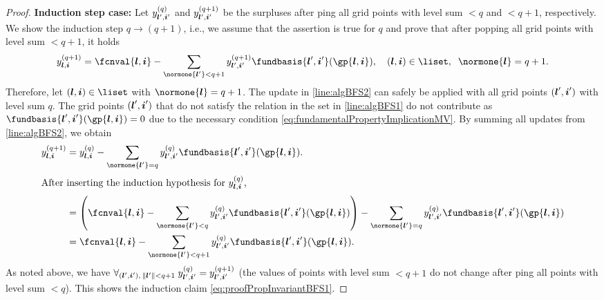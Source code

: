 \begin{proof}
  \noindent
  \textbf{Induction step case:}
  Let $\linout[(q)]{\*l',\*i'}$ and
  $\linout[(q+1)]{\*l',\*i'}$
  be the surpluses after \pop{}ping all
  grid points with level sum $< q$ and $< q + 1$, respectively.
  We show the induction step $q \to (q + 1)$, i.e.,
  we assume that the assertion is true for $q$
  and prove that after popping all grid points with level sum $< q + 1$,
  it holds
  \begin{equation}
    \label{eq:proofPropInvariantBFS1}
    \linout[(q+1)]{\*l,\*i}
    = \fcnval{\*l,\*i} -
    \sum_{\normone{\*l'} < q+1} \linout[(q+1)]{\*l',\*i'}
    \fundbasis{\*l',\*i'}(\gp{\*l,\*i}),\quad
    (\*l, \*i) \in \liset,\;\;
    \normone{\*l} = q+1.
  \end{equation}
  Therefore, let $(\*l, \*i) \in \liset$ with $\normone{\*l} = q+1$.
  The update in \cref{line:algBFS2} can safely be applied
  with all grid points $({\boldsymbol{l}}', {\boldsymbol{i}}')$ with level sum $q$.
  The grid points $({\boldsymbol{l}}', {\boldsymbol{i}}')$ that do not satisfy the relation in the set in
  \cref{line:algBFS1} do not contribute as
  $\fundbasis{\*l',\*i'}(\gp{\*l,\*i}) = 0$
  due to the necessary condition \eqref{eq:fundamentalPropertyImplicationMV}.
  By summing all updates from \cref{line:algBFS2}, we obtain
  \begin{subequations}
    \begin{align}
      \linout[(q+1)]{\*l,\*i}
      &= \linout[(q)]{\*l,\*i} -
      \sum_{\normone{\*l'} = q} \linout[(q)]{\*l',\*i'}
      \fundbasis{\*l',\*i'}(\gp{\*l,\*i}).\\
      \intertext{%
        After inserting the induction hypothesis
        for $\linout[(q)]{\*l,\*i}$,%
      }
      &= \left(\fcnval{\*l,\*i} -
      \sum_{\normone{\*l'} < q} \linout[(q)]{\*l',\*i'}
      \fundbasis{\*l',\*i'}(\gp{\*l,\*i})\right) -
      \sum_{\normone{\*l'} = q} \linout[(q)]{\*l',\*i'}
      \fundbasis{\*l',\*i'}(\gp{\*l,\*i})\\
      &= \fcnval{\*l,\*i} -
      \sum_{\normone{\*l'} < q + 1} \linout[(q)]{\*l',\*i'}
      \fundbasis{\*l',\*i'}(\gp{\*l,\*i}).
    \end{align}
  \end{subequations}
  As noted above, we have
  $\fa{(\*l', \*i'),\, \norm{\*l'} < q + 1}{
    \linout[(q)]{\*l',\*i'} = \linout[(q+1)]{\*l',\*i'}
  }$
  (the values of points with level sum $< q + 1$
  do not change after \pop{}ping all points with level sum $< q$).
  This shows the induction claim \eqref{eq:proofPropInvariantBFS1}.
\end{proof}



